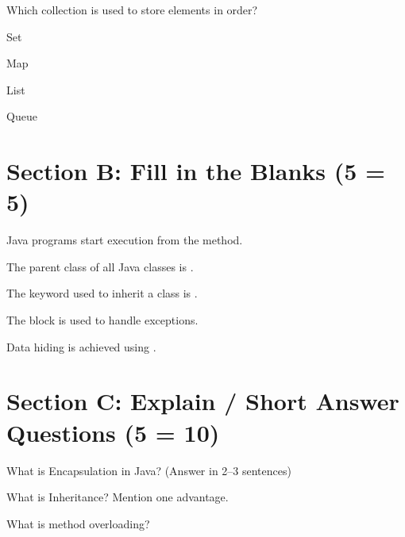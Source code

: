 \documentclass{CWNUExam}
\begin{document}
\begin{question}
Which collection is used to store elements in order?
\paren
\begin{choices}
\item Set
\item Map
\item List
\item Queue
\end{choices}
\end{question}


\section{Section B: Fill in the Blanks (5  = 5)}

\begin{question}
Java programs start execution from the \fillin method.
\end{question}

\begin{question}
The parent class of all Java classes is \fillin.
\end{question}

\begin{question}
The keyword used to inherit a class is \fillin.
\end{question}

\begin{question}
The \fillin block is used to handle exceptions.
\end{question}

\begin{question}
Data hiding is achieved using \fillin.
\end{question}


\section{Section C: Explain / Short Answer Questions (5  = 10)}

\begin{problem}
What is Encapsulation in Java? (Answer in 2--3 sentences)
\end{problem}

\begin{problem}
What is Inheritance? Mention one advantage.
\end{problem}

\begin{problem}
What is method overloading?
\end{problem}
\end{document}
